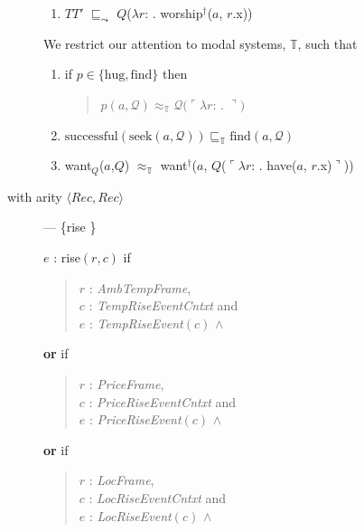 \begin{description}
\begin{description}
\begin{enumerate}
\item $T$\fbox{\d{$\wedge$}}$T'$ $\sqsubseteq_{\leadsto}$ $Q$($\lambda
  r$:
  . worship$^\dagger$($a$, $r$.x)) 

\end{enumerate}

\bigskip

    We restrict our attention to modal systems, $\mathbb{T}$, such
    that
    \begin{enumerate}
    
    \item if $p\in\{\text{hug},\text{find}\}$ then
    \begin{quote}
      $p(a,\mathcal{Q})\approx_{\mathbb{T}}\mathcal{Q}(\ulcorner\lambda
      r$: . $\urcorner)$
    \end{quote}
    
    
    
  \item $\text{successful}(\text{seek}(a,\mathcal{Q}))\sqsubseteq_{\mathbb{T}}
    \text{find}(a,\mathcal{Q})$

    
  \item want$_Q$($a$,$Q$) $\approx_{\mathbb{T}}$
want$^\dagger$($a$, $Q$($\ulcorner\lambda
r$: . have($a$, $r$.x)$\urcorner$))
\end{enumerate}
  

    \item[with arity
  \textnormal{$\langle\textit{Rec},\textit{Rec}\rangle$}] --- \{rise
  \}
  

      $e$ : rise$(r,c)$ if
  \begin{quote}
    $r$ : \textit{AmbTempFrame},\\
    $c$ : \textit{TempRiseEventCntxt} and \\
    $e$ : \textit{TempRiseEvent}$(c)$ \d{$\wedge$}
  \end{quote}
  \textbf{or} if
  \begin{quote}
    $r$ : \textit{PriceFrame},\\
    $c$ : \textit{PriceRiseEventCntxt} and \\
    $e$ : \textit{PriceRiseEvent}$(c)$ \d{$\wedge$}
  \end{quote}
  \textbf{or} if
  \begin{quote}
    $r$ : \textit{LocFrame},\\
    $c$ : \textit{LocRiseEventCntxt} and \\
    $e$ : \textit{LocRiseEvent}$(c)$ \d{$\wedge$}
  \end{quote}


\end{description}
\end{description}
